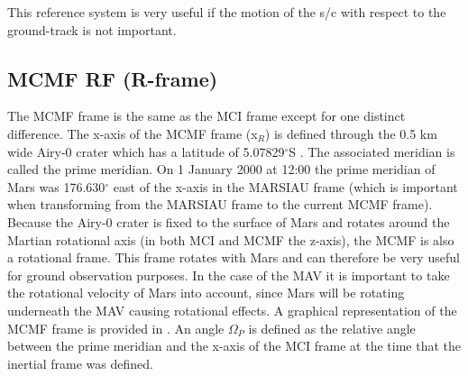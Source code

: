 
This reference system is very useful if the motion of the \ac{s/c} with respect to the ground-track is not important. 




\subsection{\acl{MCMF} \ac{RF} (R-frame)}
\label{subsec:ECEF}
The \acf{MCMF} frame is the same as the \ac{MCI} frame except for one distinct difference. The x-axis of the \ac{MCMF} frame (x$_{R}$) is defined through the 0.5 km wide Airy-0 crater \cite{morton2003mapping} which has a latitude of 5.07829$^{\circ}$S \cite{duxbury2014location}. The associated meridian is called the prime meridian. On 1 January 2000 at 12:00 the prime meridian of Mars was 176.630$^{\circ}$ east of the x-axis in the MARSIAU frame (which is important when transforming from the MARSIAU frame to the current \ac{MCMF} frame)\cite{diaz2008generic,archinal2011report}. Because the Airy-0 crater is fixed to the surface of Mars and rotates around the Martian rotational axis (in both \ac{MCI} and \ac{MCMF} the z-axis), the \ac{MCMF} is also a rotational frame. This frame rotates with Mars and can therefore be very useful for ground observation purposes. In the case of the \ac{MAV} it is important to take the rotational velocity of Mars into account, since Mars will be rotating underneath the \ac{MAV} causing rotational effects. A graphical representation of the \ac{MCMF} frame is provided in . An angle $\Omega_{P}$ is defined as the relative angle between the prime meridian and the x-axis of the \ac{MCI} frame at the time that the inertial frame was defined.



 
